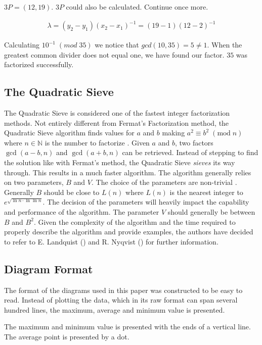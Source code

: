 $3P = (12, 19)$. $3P$ could also be calculated. Continue once more.

\begin{equation*}
    \begin{array}{l}
        \lambda = (y_2 - y_1)(x_2 - x_1)^{-1} = (19-1)(12-2)^{-1}
    \end{array}
\end{equation*}

Calculating $10^{-1}\;(mod\;35)$ we notice that $gcd(10,35)=5\neq1$. When the greatest common divider does not equal one, we have found our factor. $35$ was factorized successfully.

\subsection{The Quadratic Sieve}

The Quadratic Sieve is considered one of the fastest integer factorization methods. Not entirely different from Fermat's Factorization method, the Quadratic Sieve algorithm finds values for $a$ and $b$ making $a^2\equiv b^2\;(\text{mod}\;n)$ where $n\in\mathbb{N}$ is the number to factorize \cite{quadraticSieve}. Given $a$ and $b$, two factors $\gcd(a-b, n)$ and $\gcd(a+b, n)$ can be retrieved. Instead of stepping to find the solution like with Fermat's method, the Quadratic Sieve \textit{sieves} its way through. This results in a much faster algorithm. The algorithm generally relies on two parameters, $B$ and $V$. The choice of the parameters are non-trivial \cite{Cryptography101}. Generally $B$ should be close to $L(n)$ where $L(n)$ is the nearest integer to $e^{\sqrt{\ln{n}\cdot\ln{\ln{n}}}}$. The decision of the parameters will heavily impact the capability and performance of the algorithm. The parameter $V$ should generally be between $B$ and $B^2$. Given the complexity of the algorithm and the time required to properly describe the algorithm and provide examples, the authors have decided to refer to E. Landquist (\cite{quadraticSieve}) and R. Nyqvist (\cite{Cryptography101}) for further information.

\subsection{Diagram Format}
The format of the diagrams used in this paper was constructed to be easy to read. Instead of plotting the data, which in its raw format can span several hundred lines, the maximum, average and minimum value is presented.
\begin{figure}[H]
    \centering
    
\end{figure}
The maximum and minimum value is presented with the ends of a vertical line. The average point is presented by a dot.

